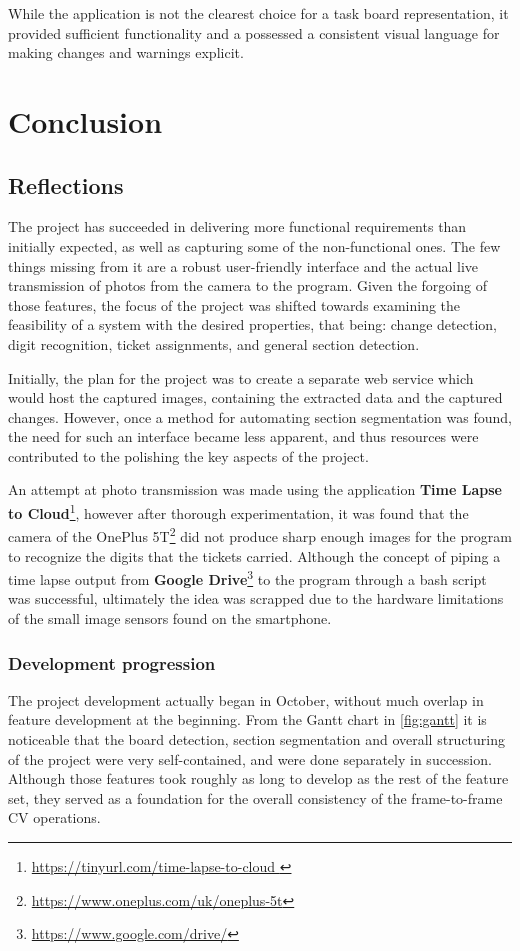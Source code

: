\documentclass[12pt]{report}
\theoremstyle{definition}
\theoremstyle{remark}
\begin{document}
While the application is not the clearest choice for a task board representation, it provided sufficient functionality and a possessed a consistent visual language for making changes and warnings explicit.


\chapter{Conclusion}
\section{Reflections}
The project has succeeded in delivering more functional requirements than initially expected, as well as capturing some of the non-functional ones. The few things missing from it are a robust user-friendly interface and the actual live transmission of photos from the camera to the program. Given the forgoing of those features, the focus of the project was shifted towards examining the feasibility of a system with the desired properties, that being: change detection, digit recognition, ticket assignments, and general section detection.

Initially, the plan for the project was to create a separate web service which would host the captured images, containing the extracted data and the captured changes. However, once a method for automating section segmentation was found, the need for such an interface became less apparent, and thus resources were contributed to the polishing the key aspects of the project.

An attempt at photo transmission was made using the application \textbf{Time Lapse to Cloud}\footnote{\url{https://tinyurl.com/time-lapse-to-cloud
}}, however after thorough experimentation, it was found that the camera of the OnePlus 5T\footnote{\url{https://www.oneplus.com/uk/oneplus-5t}} did not produce sharp enough images for the program to recognize the digits that the tickets carried. Although the concept of piping a time lapse output from \textbf{Google Drive}\footnote{\url{https://www.google.com/drive/}} to the program through a bash script was successful, ultimately the idea was scrapped due to the hardware limitations of the small image sensors found on the smartphone.

\subsection{Development progression}

The project development actually began in October, without much overlap in feature development at the beginning. From the Gantt chart in \ref{fig:gantt} it is noticeable that the board detection, section segmentation and overall structuring of the project were very self-contained, and were done separately in succession. Although those features took roughly as long to develop as the rest of the feature set, they served as a foundation for the overall consistency of the frame-to-frame CV operations.
\end{document}
